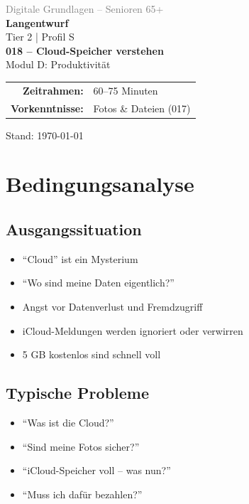 \documentclass[11pt,a4paper]{article}
\begin{document}
\begin{titlepage}
    \centering
    \vspace*{2cm}
    {\Large\textcolor{gray}{Digitale Grundlagen -- Senioren 65+}}\\[2cm]
    {\Huge\textcolor{fach}{\textbf{Langentwurf}}}\\[0.5cm]
    {\large Tier 2 | Profil S}\\[2cm]
    {\LARGE\textbf{018 -- Cloud-Speicher verstehen}}\\[0.5cm]
    {\large Modul D: Produktivität}\\[2cm]
    \begin{tabular}{rl}
        \textbf{Zeitrahmen:} & 60--75 Minuten \\
        \textbf{Vorkenntnisse:} & Fotos \& Dateien (017) \\
    \end{tabular}
    \vfill
    {\normalsize Stand: \today}
\end{titlepage}

\tableofcontents
\newpage

\section{Bedingungsanalyse}

\subsection{Ausgangssituation}
\begin{itemize}
    \item ``Cloud'' ist ein Mysterium
    \item ``Wo sind meine Daten eigentlich?''
    \item Angst vor Datenverlust und Fremdzugriff
    \item iCloud-Meldungen werden ignoriert oder verwirren
    \item 5 GB kostenlos sind schnell voll
\end{itemize}

\subsection{Typische Probleme}
\begin{itemize}
    \item ``Was ist die Cloud?''
    \item ``Sind meine Fotos sicher?''
    \item ``iCloud-Speicher voll -- was nun?''
    \item ``Muss ich dafür bezahlen?''
\end{itemize}
\end{document}
